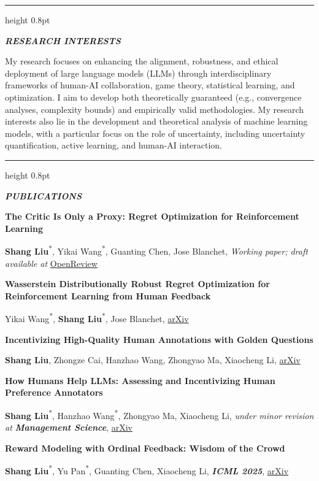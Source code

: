 \documentclass[11pt,letterpaper]{article}
\newcommand{\me}{\textbf{Shang Liu}}
\newcommand{\equalcontrib}{\textsuperscript{*}}
\newcommand{\venue}[1]{\textbf{\textit{#1}}}
\newcommand{\cvsection}[1]{%
  \vspace{8pt}%
  {\color{ruleblue}\hrule height 0.8pt}%
  \vspace{2pt}%
  {\fontsize{15}{17}\selectfont\bfseries\itshape #1}\par
  \vspace{3pt}%
}
\newenvironment{publicationlist}{%
  \begin{list}{}{%
    \setlength{\leftmargin}{0.31in}%
    \setlength{\rightmargin}{0.13in}%
    \setlength{\itemsep}{8pt}%
    \setlength{\topsep}{0pt}%
    \setlength{\parsep}{0pt}%
    \setlength{\partopsep}{0pt}%
  }%
}{\end{list}}
\newcommand{\publication}[3]{%
  \item[]\textbf{#1}\par
  #2, #3\par
}
\begin{document}
\cvsection{RESEARCH INTERESTS}

\begin{list}{}{\setlength{\leftmargin}{0.34in}\setlength{\rightmargin}{0.15in}\setlength{\topsep}{0pt}}
  \item[] My research focuses on enhancing the alignment, robustness, and ethical deployment of large
  language models (LLMs) through interdisciplinary frameworks of human-AI collaboration, game
  theory, statistical learning, and optimization. I aim to develop both theoretically guaranteed
  (e.g., convergence analyses, complexity bounds) and empirically valid methodologies. My
  research interests also lie in the development and theoretical analysis of machine learning
  models, with a particular focus on the role of uncertainty, including uncertainty quantification,
  active learning, and human-AI interaction.
\end{list}

\cvsection{PUBLICATIONS}

\hspace{0.30in}{\small (reverse chronological order; *: equal contribution)}\par
\vspace{3pt}
\begin{publicationlist}
  \publication
    {The Critic Is Only a Proxy: Regret Optimization for Reinforcement Learning}
    {\me\equalcontrib, Yikai Wang\equalcontrib, Guanting Chen, Jose Blanchet}
    {\textit{Working paper; draft available at }\href{https://openreview.net/forum?id=gJFBMqK6U2}{OpenReview}}

  \publication
    {Wasserstein Distributionally Robust Regret Optimization for Reinforcement Learning from Human Feedback}
    {Yikai Wang\equalcontrib, \me\equalcontrib, Jose Blanchet}
    {\href{https://arxiv.org/abs/2605.00155/}{arXiv}}

  \publication
    {Incentivizing High-Quality Human Annotations with Golden Questions}
    {\me, Zhongze Cai, Hanzhao Wang, Zhongyao Ma, Xiaocheng Li}
    {\href{https://arxiv.org/abs/2505.19134/}{arXiv}}

  \publication
    {How Humans Help LLMs: Assessing and Incentivizing Human Preference Annotators}
    {\me\equalcontrib, Hanzhao Wang\equalcontrib, Zhongyao Ma, Xiaocheng Li}
    {\textit{under minor revision at }\venue{Management Science}, \href{https://arxiv.org/abs/2502.06387/}{arXiv}}

  \publication
    {Reward Modeling with Ordinal Feedback: Wisdom of the Crowd}
    {\me\equalcontrib, Yu Pan\equalcontrib, Guanting Chen, Xiaocheng Li}
    {\venue{ICML 2025}, \href{https://arxiv.org/abs/2411.12843/}{arXiv}}
\end{publicationlist}
\end{document}
